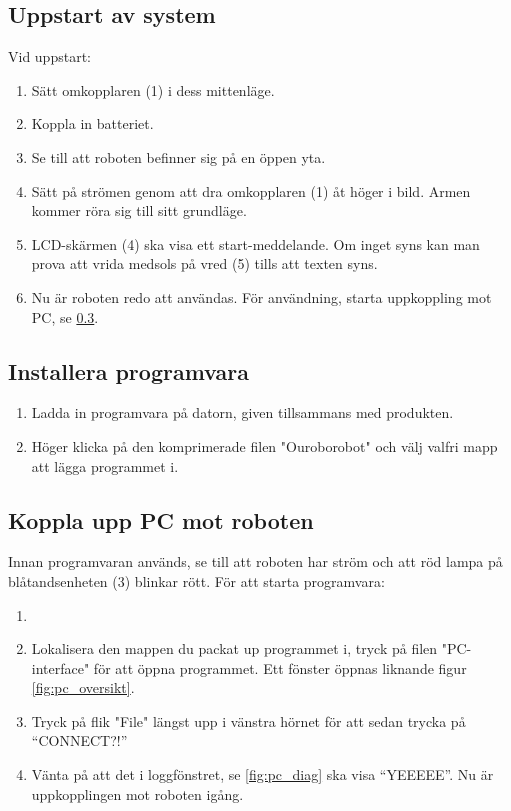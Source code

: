 \documentclass[a4paper,12pt]{article}
\begin{document}
\subsection{Uppstart av system}
Vid uppstart:
\begin{enumerate}
    \item Sätt omkopplaren (1) i dess mittenläge.
    \item Koppla in batteriet.
    \item Se till att roboten befinner sig på en öppen yta.
    \item Sätt på strömen genom att dra omkopplaren (1) åt höger i bild. Armen kommer röra sig till sitt grundläge.
    \item LCD-skärmen (4) ska visa ett start-meddelande. Om inget syns kan man prova att vrida medsols på vred (5) tills att texten syns.
    \item  Nu är roboten redo att användas. För användning, starta uppkoppling mot PC, se \ref{subsec:start_pc}.
\end{enumerate}

\subsection{Installera programvara}
\label{subsec:install_pc}
\begin{enumerate}
    \item Ladda in programvara på datorn, given tillsammans med produkten.
    \item Höger klicka på den komprimerade filen "Ouroborobot" och välj valfri mapp att lägga programmet i.
\end{enumerate}


\subsection{Koppla upp PC mot roboten}
\label{subsec:start_pc}
Innan programvaran används, se till att roboten har ström och att röd lampa på blåtandsenheten (3) blinkar rött. För att starta programvara:
\begin{enumerate}
    \item \item Lokalisera den mappen du packat up programmet i, tryck på filen "PC-interface" för att öppna programmet.  Ett fönster öppnas liknande figur \ref{fig:pc_oversikt}. 
    \item Tryck på flik "File"  längst upp i vänstra hörnet för att sedan trycka på “CONNECT?!”
    \item Vänta på att det i loggfönstret, se \ref{fig:pc_diag}  ska visa “YEEEEE”. Nu är uppkopplingen mot roboten igång. 
\end{enumerate}
\end{document}
